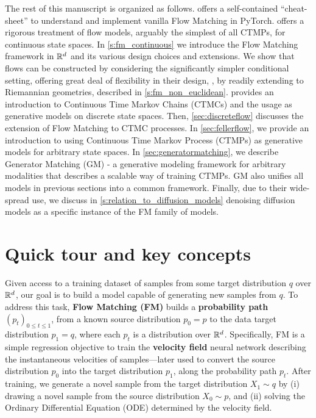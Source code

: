 \documentclass{fairmeta}
\newcommand{\highlight}[1]{{\color{metablue} \textbf{#1}}}
\numberwithin{equation}{section}
\begin{document}
The rest of this manuscript is organized as follows.
 offers a self-contained ``cheat-sheet'' to understand and implement vanilla Flow Matching in PyTorch.
 offers a rigorous treatment of flow models, arguably the simplest of all CTMPs, for continuous state spaces. 
In \cref{s:fm_continuous} we introduce the Flow Matching framework in $\mathbb R^d$ and its various design choices and extensions. We show that flows can be constructed by considering the significantly simpler conditional setting, offering great deal of flexibility in their design, \eg, by readily extending to Riemannian geometries, described in \cref{s:fm_non_euclidean}.
 provides an introduction to Continuous Time Markov Chains (CTMCs) and the usage as generative models on discrete state spaces. 
Then, \cref{sec:discreteflow} discusses the extension of Flow Matching to CTMC processes. 
In \cref{sec:fellerflow}, we provide an introduction to using Continuous Time Markov Process (CTMPs) as generative models for arbitrary state spaces.
In \cref{sec:generatormatching}, we describe Generator Matching (GM) - a generative modeling framework for arbitrary modalities that describes a scalable way of training CTMPs. GM also unifies all models in previous sections into a common framework.
Finally, due to their wide-spread use, we discuss in \cref{s:relation_to_diffusion_models} denoising diffusion models as a specific instance of the FM family of models.


\section{Quick tour and key concepts}\label{s:quick_tour}

Given access to a training dataset of samples from some target distribution $q$ over $\mathbb{R}^d$, our goal is to build a model capable of generating new samples from $q$.
To address this task, \highlight{Flow Matching (FM)} builds a \highlight{probability path} $(p_t)_{0\leq t\leq 1}$, from a known source distribution $p_0=p$ to the data target distribution $p_1=q$, where each $p_t$ is a distribution over $\mathbb{R}^d$.
Specifically, FM is a simple regression objective to train the \highlight{velocity field} neural network describing the instantaneous velocities of samples---later used to convert the source distribution $p_0$ into the target distribution $p_1$, along the probability path $p_t$. 
After training, we generate a novel sample from the target distribution $X_1 \sim q$ by (i) drawing a novel sample from the source distribution $X_0 \sim p$, and (ii) solving the Ordinary Differential Equation (ODE) determined by the velocity field.
\end{document}
